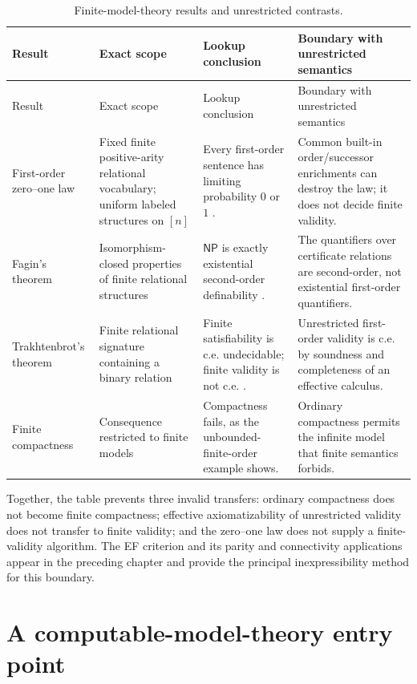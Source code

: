 \begin{landscape}
\begingroup\small\setlength{\tabcolsep}{4pt}
\begin{longtable}{@{}p{1.22in}p{1.62in}p{2.25in}p{2.06in}@{}}
\caption{Finite-model-theory results and unrestricted contrasts.}
\label{tab:p03-finite-model-theory}\\
\toprule
Result & Exact scope & Lookup conclusion & Boundary with unrestricted semantics \\
\midrule\endfirsthead
\toprule
Result & Exact scope & Lookup conclusion & Boundary with unrestricted semantics \\
\midrule\endhead
First-order zero--one law & Fixed finite positive-arity relational vocabulary; uniform labeled structures on \([n]\) & Every first-order sentence has limiting probability \(0\) or \(1\) \cite{GlebskiiEtAl1969,Fagin1976}. & Common built-in order/successor enrichments can destroy the law; it does not decide finite validity. \\
\addlinespace
Fagin's theorem & Isomorphism-closed properties of finite relational structures & \(\mathsf{NP}\) is exactly existential second-order definability \cite{Fagin1974}. & The quantifiers over certificate relations are second-order, not existential first-order quantifiers. \\
\addlinespace
Trakhtenbrot's theorem & Finite relational signature containing a binary relation & Finite satisfiability is c.e. undecidable; finite validity is not c.e. \cite{Trakhtenbrot1950}. & Unrestricted first-order validity is c.e. by soundness and completeness of an effective calculus. \\
\addlinespace
Finite compactness & Consequence restricted to finite models & Compactness fails, as the unbounded-finite-order example shows. & Ordinary compactness permits the infinite model that finite semantics forbids. \\
\bottomrule
\end{longtable}
\endgroup
\end{landscape}

Together, the table prevents three invalid transfers: ordinary compactness does
not become finite compactness; effective axiomatizability of unrestricted
validity does not transfer to finite validity; and the zero--one law does not
supply a finite-validity algorithm.  The EF criterion and its parity and
connectivity applications appear in the preceding chapter and provide the
principal inexpressibility method for this boundary.

\section{A computable-model-theory entry point}
\label{sec:p03-computable-model-theory}

